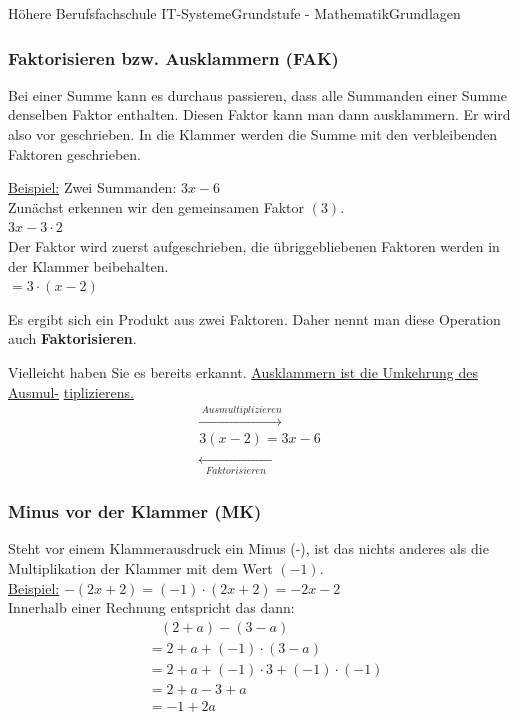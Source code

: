 \documentclass[11pt,twocolumn,oneside,openany,headings=optiontotoc,11pt,numbers=noenddot]{article}
\begin{document}
\begin{worksheet}{Höhere Berufsfachschule IT-Systeme}{Grundstufe - Mathematik}{Grundlagen}
		\subsubsection*{Faktorisieren bzw. Ausklammern (FAK)}
		Bei einer Summe kann es durchaus passieren, dass alle Summanden einer Summe denselben Faktor enthalten. Diesen Faktor kann man dann ausklammern. Er wird also vor geschrieben. In die Klammer werden die Summe mit den verbleibenden Faktoren geschrieben.\\
		\par\noindent
		\underline{Beispiel:} Zwei Summanden: \(3x - 6\)\\
		Zunächst erkennen wir den gemeinsamen Faktor \((3)\).\\
		\(\mbox{3}x - \mbox{3}\cdot{}2\)\\
		Der Faktor wird zuerst aufgeschrieben, die übriggebliebenen Faktoren werden in der Klammer beibehalten.\\
		\(= \mbox{3}\cdot{}(x - 2)\)\\
		\par\noindent
		Es ergibt sich ein Produkt aus zwei Faktoren. Daher nennt man diese Operation auch \textbf{Faktorisieren}.\\
		\par\noindent
		Vielleicht haben Sie es bereits erkannt. \underline{Ausklammern ist die Umkehrung des Ausmul-} \underline{tiplizierens.}
		\begin{align*}
			\xrightarrow{\ Ausmultiplizieren}\\
			3(x-2) = 3x - 6\\
			\xleftarrow[\ \ \ Faktorisieren\ \ \ ]{}
		\end{align*}
		\subsubsection*{Minus vor der Klammer (MK)}
		Steht vor einem Klammerausdruck ein Minus (-), ist das nichts anderes als die Multiplikation der Klammer mit dem Wert \((-1)\).\\
		\underline{Beispiel:} \(-(2x + 2) = (-1)\cdot{}(2x+2) = -2x - 2\)\\
		Innerhalb einer Rechnung entspricht das dann:
		\begin{align*}
			& \ \ \ \ (2+a) - (3 - a)\\
			& = 2 + a + (-1)\cdot{}(3-a)\\
			& = 2 + a + (-1)\cdot{}3 + (-1)\cdot{}(-1)\\
			& = 2 + a - 3 + a\\
			& = -1 + 2a
		\end{align*}

\end{worksheet}
\end{document}
